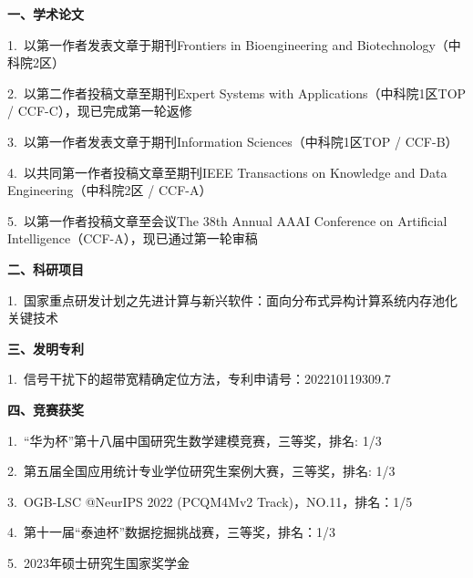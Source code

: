 \cleardoublepage
{}

\noindent {}
\vskip 10pt

\vskip 5pt
\noindent \textbf{一、学术论文}
\vskip 5pt 

1.~以第一作者发表文章于期刊Frontiers in Bioengineering and Biotechnology（中科院2区）

2.~以第二作者投稿文章至期刊Expert Systems with Applications（中科院1区TOP / CCF-C），现已完成第一轮返修

3.~以第一作者发表文章于期刊Information Sciences（中科院1区TOP / CCF-B）

4.~以共同第一作者投稿文章至期刊IEEE Transactions on Knowledge and Data Engineering（中科院2区 / CCF-A）

5.~以第一作者投稿文章至会议The 38th Annual AAAI Conference on Artificial Intelligence（CCF-A），现已通过第一轮审稿

\vskip 5pt 
\noindent \textbf{二、科研项目}
\vskip 5pt 

1.~国家重点研发计划之先进计算与新兴软件：面向分布式异构计算系统内存池化关键技术




\vskip 5pt 
\noindent \textbf{三、发明专利}
\vskip 5pt 

1.~信号干扰下的超带宽精确定位方法，专利申请号：202210119309.7

\vskip 5pt 
\noindent \textbf{四、竞赛获奖}
\vskip 5pt 

1.~“华为杯”第十八届中国研究生数学建模竞赛，三等奖，排名: 1/3

2.~第五届全国应用统计专业学位研究生案例大赛，三等奖，排名: 1/3

3.~OGB-LSC @NeurIPS 2022 (PCQM4Mv2 Track)，NO.11，排名：1/5

4.~第十一届“泰迪杯”数据挖掘挑战赛，三等奖，排名：1/3

5.~2023年硕士研究生国家奖学金
\newpage